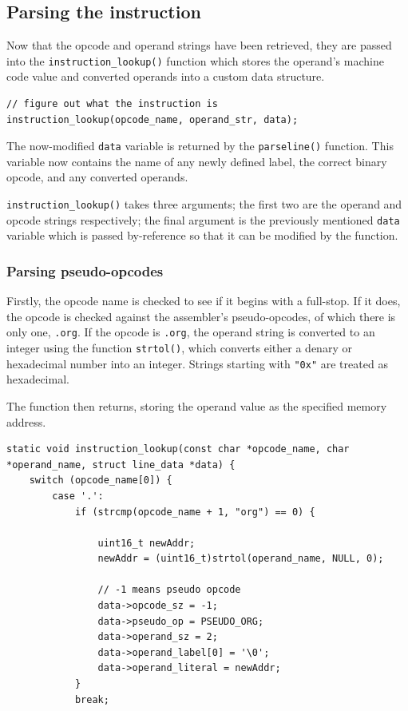 \documentclass[a4paper]{report}
\begin{document}
\subsection{Parsing the instruction}

Now that the opcode and operand strings have been retrieved, they are passed
into the \texttt{instruction\_lookup()} function which stores the operand's
machine code value and converted operands into a custom data structure.

\begin{lstlisting}
// figure out what the instruction is
instruction_lookup(opcode_name, operand_str, data);
\end{lstlisting}

The now-modified \texttt{data} variable is returned by the \texttt{parseline()}
function. This variable now contains the name of any newly defined label, the
correct binary opcode, and any converted operands.

\texttt{instruction\_lookup()} takes three arguments; the first two are the
operand and opcode strings respectively; the final argument is the previously
mentioned \texttt{data} variable which is passed by-reference so that it can be
modified by the function.

\subsubsection{Parsing pseudo-opcodes}

Firstly, the opcode name is checked to see if it begins with a full-stop. If it
does, the opcode is checked against the assembler's pseudo-opcodes, of which
there is only one, \texttt{.org}. If the opcode is \texttt{.org}, the operand
string is converted to an integer using the function \texttt{strtol()}, which
converts either a denary or hexadecimal number into an integer. Strings starting
with \texttt{"0x"} are treated as hexadecimal.

The function then returns, storing the operand value as the specified memory
address.

\begin{lstlisting}
static void instruction_lookup(const char *opcode_name, char *operand_name, struct line_data *data) {
	switch (opcode_name[0]) {
		case '.':
			if (strcmp(opcode_name + 1, "org") == 0) {

				uint16_t newAddr;
				newAddr = (uint16_t)strtol(operand_name, NULL, 0);

				// -1 means pseudo opcode
				data->opcode_sz = -1;
				data->pseudo_op = PSEUDO_ORG;
				data->operand_sz = 2;
				data->operand_label[0] = '\0';
				data->operand_literal = newAddr;
			}
			break;
\end{lstlisting}
\end{document}
